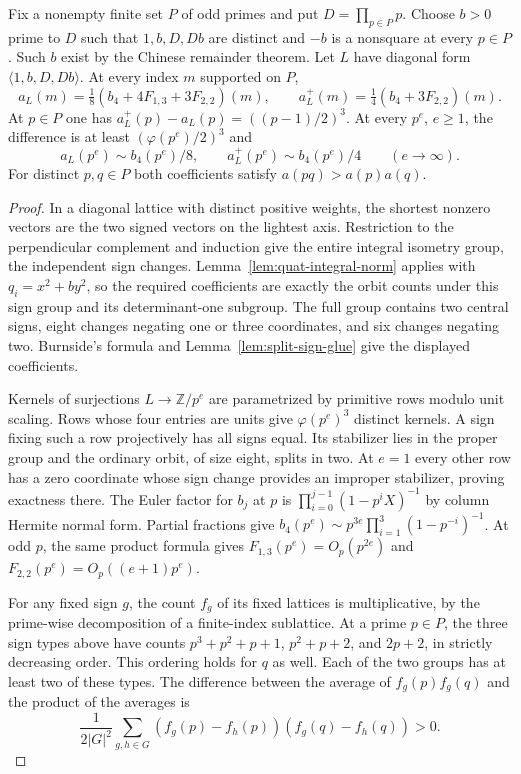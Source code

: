 \begin{theorem}\label{thm:quat-sign-family}
Fix a nonempty finite set $P$ of odd primes and put $D=\prod_{p\in P}p$. Choose $b>0$ prime to $D$ such that $1,b,D,Db$ are distinct and $-b$ is a nonsquare at every $p\in P$. Such $b$ exist by the Chinese remainder theorem. Let $L$ have diagonal form $\langle1,b,D,Db\rangle$. At every index $m$ supported on $P$,
\[
 a_L(m)=\tfrac18(b_4+4F_{1,3}+3F_{2,2})(m),\qquad
 a_L^+(m)=\tfrac14(b_4+3F_{2,2})(m).
\]
At $p\in P$ one has $a_L^+(p)-a_L(p)=((p-1)/2)^3$. At every $p^e$, $e\ge1$, the difference is at least $(\varphi(p^e)/2)^3$ and
\[
 a_L(p^e)\sim b_4(p^e)/8,\qquad a_L^+(p^e)\sim b_4(p^e)/4\qquad (e\to\infty).
\]
For distinct $p,q\in P$ both coefficients satisfy $a(pq)>a(p)a(q)$.
\end{theorem}
\begin{proof}
In a diagonal lattice with distinct positive weights, the shortest nonzero vectors are the two signed vectors on the lightest axis. Restriction to the perpendicular complement and induction give the entire integral isometry group, the independent sign changes. Lemma~\ref{lem:quat-integral-norm} applies with $q_i=x^2+by^2$, so the required coefficients are exactly the orbit counts under this sign group and its determinant-one subgroup. The full group contains two central signs, eight changes negating one or three coordinates, and six changes negating two. Burnside's formula and Lemma~\ref{lem:split-sign-glue} give the displayed coefficients.

Kernels of surjections $L\to\mathbb Z/p^e$ are parametrized by primitive rows modulo unit scaling. Rows whose four entries are units give $\varphi(p^e)^3$ distinct kernels. A sign fixing such a row projectively has all signs equal. Its stabilizer lies in the proper group and the ordinary orbit, of size eight, splits in two. At $e=1$ every other row has a zero coordinate whose sign change provides an improper stabilizer, proving exactness there. The Euler factor for $b_j$ at $p$ is $\prod_{i=0}^{j-1}(1-p^i X)^{-1}$ by column Hermite normal form. Partial fractions give $b_4(p^e)\sim p^{3e}\prod_{i=1}^3(1-p^{-i})^{-1}$. At odd $p$, the same product formula gives $F_{1,3}(p^e)=O_p(p^{2e})$ and $F_{2,2}(p^e)=O_p((e+1)p^e)$.

For any fixed sign $g$, the count $f_g$ of its fixed lattices is multiplicative, by the prime-wise decomposition of a finite-index sublattice. At a prime $p\in P$, the three sign types above have counts $p^3+p^2+p+1$, $p^2+p+2$, and $2p+2$, in strictly decreasing order. This ordering holds for $q$ as well. Each of the two groups has at least two of these types. The difference between the average of $f_g(p)f_g(q)$ and the product of the averages is
\[
 \frac{1}{2|G|^2}\sum_{g,h\in G}
 (f_g(p)-f_h(p))(f_g(q)-f_h(q))>0.
\]
\end{proof}

